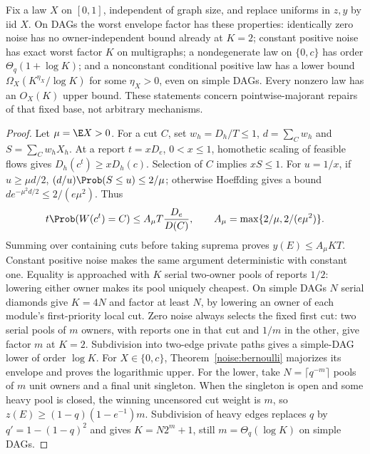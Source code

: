 \begin{theorem}\label{noise:classification}
Fix a law $X$ on $[0,1]$, independent of graph size, and replace uniforms
in $z,y$ by iid $X$. On DAGs the worst envelope factor has these properties:
identically zero noise has no owner-independent bound already at $K=2$;
constant positive noise has exact worst factor $K$ on multigraphs;
a nondegenerate law on $\{0,c\}$ has order $\Theta_q(1+\log K)$;
and a nonconstant conditional positive law has a lower bound
$\Omega_X(K^{\eta_X}/\log K)$ for some $\eta_X>0$, even on simple DAGs.
Every nonzero law has an $O_X(K)$ upper bound. These statements concern
pointwise-majorant repairs of that fixed base, not arbitrary mechanisms.
\end{theorem}
\begin{proof}
Let $\mu=\E X>0$. For a cut $C$, set $w_h=D_h/T\le1$,
$d=\sum_Cw_h$ and $S=\sum_Cw_hX_h$. At a report $t=xD_e$, $0<x\le1$,
homothetic scaling of feasible flows gives $D_h(c^t)\ge xD_h(c)$.
Selection of $C$ implies $xS\le1$. For $u=1/x$, if $u\ge\mu d/2$,
$(d/u)\Prob(S\le u)\le2/\mu$; otherwise Hoeffding gives a bound
$d e^{-\mu^2d/2}\le2/(e\mu^2)$. Thus
\[
 t\Prob(W(c^t)=C)\le A_\mu T\frac{D_e}{D(C)},\qquad
 A_\mu=\max\{2/\mu,2/(e\mu^2)\}.
\]
Summing over containing cuts before taking suprema proves $y(E)\le A_\mu KT$.
Constant positive noise makes the same argument deterministic with constant
one. Equality is approached with $K$ serial two-owner pools of reports
$1/2$: lowering either owner makes its pool uniquely cheapest. On simple
DAGs $N$ serial diamonds give $K=4N$ and factor at least $N$, by lowering
an owner of each module's first-priority local cut.
Zero noise always selects the fixed first cut: two serial pools of $m$
owners, with reports one in that cut and $1/m$ in the other, give factor
$m$ at $K=2$. Subdivision into two-edge private paths gives a simple-DAG
lower of order $\log K$.
For $X\in\{0,c\}$, Theorem~\ref{noise:bernoulli} majorizes its envelope
and proves the logarithmic upper. For the lower, take
$N=\lceil q^{-m}\rceil$ pools of $m$ unit owners and a final unit singleton.
When the singleton is open and some heavy pool is closed, the winning
uncensored cut weight is $m$, so $z(E)\ge(1-q)(1-e^{-1})m$.
Subdivision of heavy edges replaces $q$ by $q'=1-(1-q)^2$ and gives
$K=N2^m+1$, still $m=\Theta_q(\log K)$ on simple DAGs.


\end{proof}
